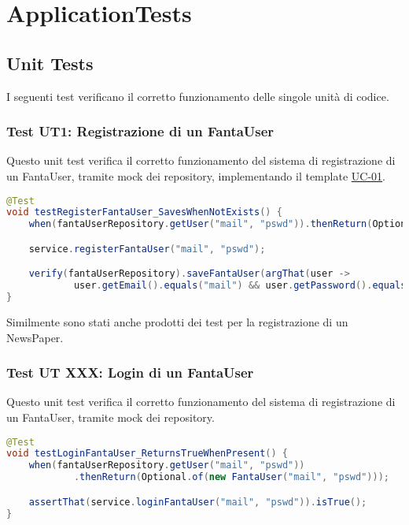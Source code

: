 \section{ApplicationTests}

\subsection{Unit Tests}

I seguenti test verificano il corretto funzionamento delle singole unità di codice.

\subsubsection{Test UT1: Registrazione di un FantaUser} \label{UT1}

Questo unit test verifica il corretto funzionamento del sistema di registrazione di un FantaUser, 
tramite mock dei repository, implementando il template \hyperref[UC-01]{UC-01}.

\begin{lstlisting}[language=Java]
@Test
void testRegisterFantaUser_SavesWhenNotExists() {
    when(fantaUserRepository.getUser("mail", "pswd")).thenReturn(Optional.empty());

    service.registerFantaUser("mail", "pswd");

    verify(fantaUserRepository).saveFantaUser(argThat(user ->
            user.getEmail().equals("mail") && user.getPassword().equals("pswd")));
}
\end{lstlisting}

Similmente sono stati anche prodotti dei test per la registrazione di un NewsPaper.


\subsubsection{Test UT XXX: Login di un FantaUser} \label{UT2}

Questo unit test verifica il corretto funzionamento del sistema di registrazione di un FantaUser, 
tramite mock dei repository.

\begin{lstlisting}[language=Java]
@Test
void testLoginFantaUser_ReturnsTrueWhenPresent() {
    when(fantaUserRepository.getUser("mail", "pswd"))
            .thenReturn(Optional.of(new FantaUser("mail", "pswd")));

    assertThat(service.loginFantaUser("mail", "pswd")).isTrue();
}
\end{lstlisting}

